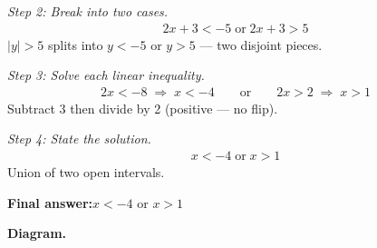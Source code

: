 \documentclass[11pt]{article}
\begin{document}
\textit{Step 2: Break into two cases.}
\[\begin{gathered}
2x + 3 < -5 \;\text{or}\; 2x + 3 > 5
\end{gathered}\]
\( |y| > 5 \) splits into \( y < -5 \) or \( y > 5 \) --- two disjoint pieces.

\textit{Step 3: Solve each linear inequality.}
\[\begin{gathered}
2x < -8 \;\Rightarrow\; x < -4 \qquad \text{or} \qquad 2x > 2 \;\Rightarrow\; x > 1
\end{gathered}\]
Subtract 3 then divide by 2 (positive --- no flip).

\textit{Step 4: State the solution.}
\[\begin{gathered}
x < -4 \;\text{or}\; x > 1
\end{gathered}\]
Union of two open intervals.

\begin{answerbox}
\textbf{Final answer:}\quad \(\displaystyle x < -4\) or \(\displaystyle x > 1\)
\end{answerbox}
\textbf{Diagram.}
\end{document}
